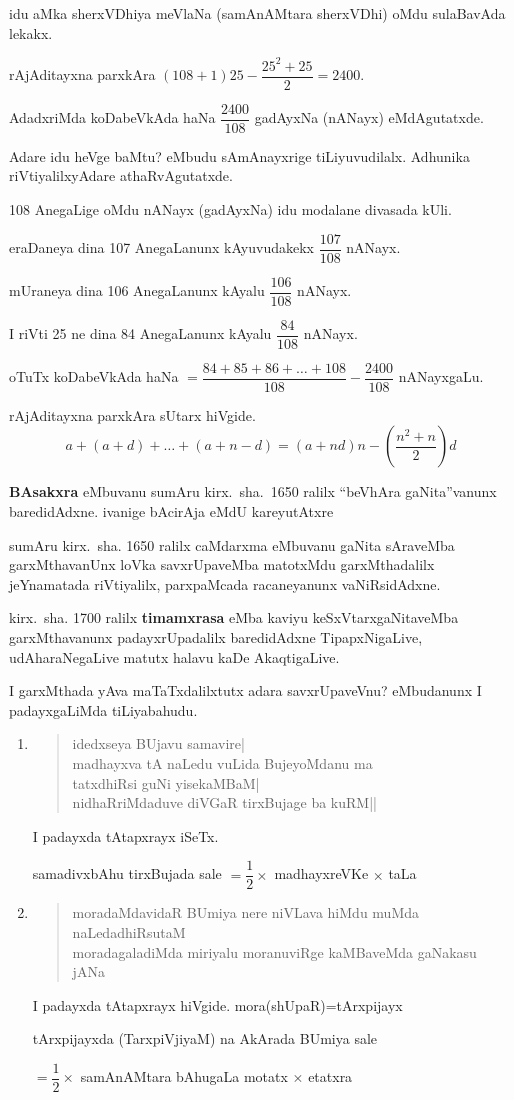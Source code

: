 idu aMka sherxVDhiya meVlaNa (samAnAMtara sherxVDhi) oMdu sulaBavAda lekakx.

rAjAditayxna parxkAra $(108+1)25-\dfrac{25^2+25}{2}=2400$.

AdadxriMda koDabeVkAda haNa $\dfrac{2400}{108}$ gadAyxNa (nANayx) eMdAgutatxde.

Adare idu heVge baMtu? eMbudu sAmAnayxrige tiLiyuvudilalx. Adhunika riVtiyalilxyAdare athaRvAgutatxde.

{\rm 108} AnegaLige oMdu nANayx (gadAyxNa) idu modalane divasada kUli.

eraDaneya dina {\rm 107} AnegaLanunx kAyuvudakekx $\dfrac{107}{108}$ nANayx.

mUraneya dina {\rm 106} AnegaLanunx kAyalu $\dfrac{106}{108}$ nANayx.

I riVti {\rm 25} ne dina {\rm 84} AnegaLanunx kAyalu $\dfrac{84}{108}$ nANayx.

oTuTx koDabeVkAda haNa $=\dfrac{84+85+86+\ldots+108}{108}-\dfrac{2400}{108}$ nANayxgaLu.

rAjAditayxna parxkAra sUtarx hiVgide.
$$
a+(a+d)+\ldots+(a+n-d)
=(a+nd)n- \left(\dfrac{n^2+n}{2} \right)d
$$

\textbf{BAsakxra} eMbuvanu sumAru kirx.~sha.~{\rm 1650} ralilx ``beVhAra gaNita''vanunx baredi\-dAdxne. ivanige bAcirAja eMdU kareyutAtxre 

sumAru kirx.~sha. {\rm 1650} ralilx caMdarxma eMbuvanu gaNita sAraveMba garxMthavanUnx loVka savxrUpaveMba matotxMdu garxMthadalilx jeYnamatada riVtiyalilx, parxpaMcada racaneyanunx vaNiRsidAdxne.

kirx.~sha. {\rm 1700} ralilx \textbf{timamxrasa} eMba kaviyu keSxVtarxgaNitaveMba garxMthavanunx padayxrUpa\-dalilx baredidAdxne TipapxNigaLive, udAharaNegaLive matutx halavu kaDe AkaqtigaLive.

I garxMthada yAva maTaTxdalilxtutx adara savxrUpaveVnu? eMbudanunx I padayxgaLiMda tiLiyabahudu.
\begin{enumerate}[\rm 1)]
\item 
\begin{verse}
idedxseya BUjavu samavire|\\
madhayxva tA naLedu vuLida BujeyoMdanu ma\\
tatxdhiRsi guNi yisekaMBaM|\\
nidhaRriMdaduve diVGaR tirxBujage ba kuRM||
\end{verse}
I padayxda tAtapxrayx iSeTx. 

samadivxbAhu tirxBujada sale $=\dfrac{1}{2}\times$ madhayxreVKe $\times$ taLa

\item 
\begin{verse}
moradaMdavidaR BUmiya nere niVLava hiMdu muMda naLe\-dadhiRsutaM\\
moradagaladiMda miriyalu moranuviRge kaMBaveMda gaNakasu jANa
\end{verse}

I padayxda tAtapxrayx hiVgide. \qquad mora(shUpaR)=tArxpijayx

tArxpijayxda (TarxpiVjiyaM) na AkArada BUmiya sale 

$=\dfrac{1}{2}\times$ samAnAMtara bAhugaLa motatx $\times$ etatxra
\end{enumerate}

